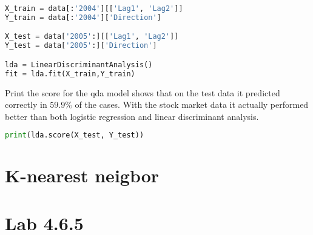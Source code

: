 \begin{lstlisting}[language=Python, label=lst:qdaModel, caption=creating quadratic discriminant analysis model sklearn]
X_train = data[:'2004'][['Lag1', 'Lag2']]
Y_train = data[:'2004']['Direction']

X_test = data['2005':][['Lag1', 'Lag2']]
Y_test = data['2005':]['Direction']

lda = LinearDiscriminantAnalysis()
fit = lda.fit(X_train,Y_train)
\end{lstlisting}

Print the score for the qda model shows that on the test data it predicted correctly in $59.9\%$ of the cases. With the stock market data it actually performed better than both logistic regression and linear discriminant analysis.
\begin{lstlisting}[language=Python, label=lst:qdaScore, caption=printing lda score]
print(lda.score(X_test, Y_test))
\end{lstlisting}





\section{K-nearest neigbor}

\section{Lab 4.6.5}

